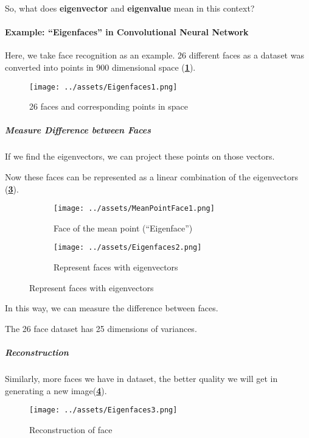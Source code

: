 \documentclass[a4paper, openany]{book}
\begin{document}
So, what does \textbf{eigenvector} and \textbf{eigenvalue} mean in this context?

\paragraph{Example: ``Eigenfaces'' in Convolutional Neural Network}

Here, we take face recognition as an example. 26 different faces as a dataset was converted into points in 900 dimensional space (\textbf{\cref{fig:Eigenfaces1}}).

\begin{figure}[htbp]
  \centering
  \texttt{[image: ../assets/Eigenfaces1.png]}
  \caption{26 faces and corresponding points in space}
  \label{fig:Eigenfaces1}
\end{figure}

\subparagraph{Measure Difference between Faces}
If we find the eigenvectors, we can project these points on those vectors.

Now these faces can be represented as a linear combination of the eigenvectors (\textbf{\cref{fig:Eigenfaces2}}).

\begin{figure}[htbp]
  \centering
  \begin{subfigure}{0.3\textwidth}
    \centering
    \texttt{[image: ../assets/MeanPointFace1.png]}
    \caption{Face of the mean point (``Eigenface'')}
  \end{subfigure}
  \begin{subfigure}{0.66\textwidth}
    \centering
    \texttt{[image: ../assets/Eigenfaces2.png]}
    \caption{Represent faces with eigenvectors}
    \label{fig:Eigenfaces2}
  \end{subfigure}
\end{figure}

In this way, we can measure the difference between faces.

The 26 face dataset has 25 dimensions of variances.

\subparagraph{Reconstruction}

Similarly, more faces we have in dataset, the better quality we will get in generating a new image(\textbf{\cref{fig:Eigenfaces3}}).

\begin{figure}[htbp]
  \centering
  \texttt{[image: ../assets/Eigenfaces3.png]}
  \caption{Reconstruction of face}
  \label{fig:Eigenfaces3}
\end{figure}
\end{document}
